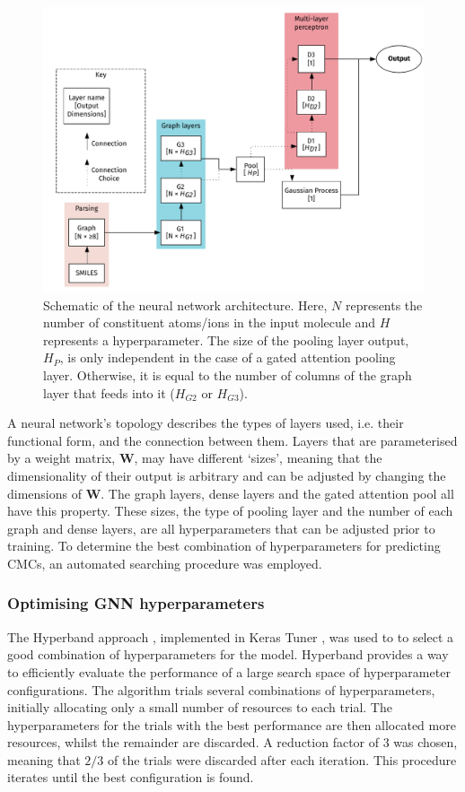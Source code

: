 \begin{figure}
    \centering
    \includegraphics[width=\textwidth]{images/model_graph.pdf}
    \caption{Schematic of the neural network architecture. Here, $N$ represents
    the number of constituent atoms/ions in the input molecule and $H$
    represents a hyperparameter. The size of the pooling layer output, $H_P$, is
    only independent in the case of a gated attention pooling layer. Otherwise,
    it is equal to the number of columns of the graph layer that feeds into it
    ($H_{G2}$ or $H_{G3}$).}
    \label{fig:model-topology}
\end{figure}

A neural network's topology describes the types of layers used, i.e. their
functional form, and the connection between them. Layers that are parameterised
by a weight matrix, $\mathbf{W}$, may have different `sizes', meaning that the
dimensionality of their output is arbitrary and can be adjusted by changing the
dimensions of $\mathbf{W}$. The graph layers, dense layers and the gated
attention pool all have this property. These sizes, the type of pooling layer
and the number of each graph and dense layers, are all hyperparameters that can
be adjusted prior to training. To determine the best combination of
hyperparameters for predicting CMCs, an automated searching procedure was
employed.

\subsubsection{Optimising GNN hyperparameters}

The Hyperband approach \cite{liHyperbandNovelBanditBased2018}, implemented in
Keras Tuner \cite{cholletKeras2015}, was used to to select a good combination of
hyperparameters for the model. Hyperband provides a way to efficiently evaluate
the performance of a large search space of hyperparameter configurations. The
algorithm trials several combinations of hyperparameters, initially allocating
only a small number of resources to each trial. The hyperparameters for the
trials with the best performance are then allocated more resources, whilst the
remainder are discarded. A reduction factor of 3 was chosen, meaning that $2/3$
of the trials were discarded after each iteration. This procedure iterates until
the best configuration is found.

